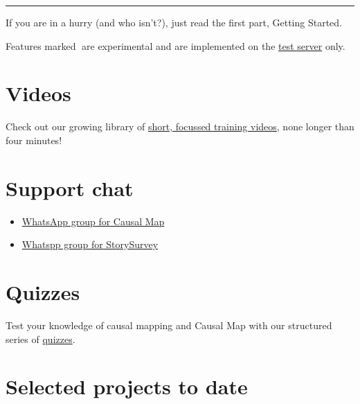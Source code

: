 \documentclass[
]{book}
\begin{document}
\begin{center}\rule{0.5\linewidth}{0.5pt}\end{center}

If you are in a hurry (and who isn't?), just read the first part, Getting Started.

Features marked 🧪are experimental and are implemented on the \href{https://causalmap.shinyapps.io/CM2test}{test server} only.

\hypertarget{videos}{%
\section{Videos}\label{videos}}

Check out our growing library of \href{https://guide.causalmap.app/xvideo-list.html}{short, focussed training videos}, none longer than four minutes!

\hypertarget{support-chat}{%
\section{Support chat}\label{support-chat}}

\begin{itemize}
\item
  \href{https://chat.whatsapp.com/KwWn0lfpHuR0qJKtkuGZUA}{WhatsApp group for Causal Map}
\item
  \href{https://chat.whatsapp.com/CdlkCKV8bP7ATYc4nioL0T}{Whatspp group for StorySurvey}

  \hypertarget{section}{%
  \section{}\label{section}}
\end{itemize}

\hypertarget{quizzes}{%
\section{Quizzes}\label{quizzes}}

Test your knowledge of causal mapping and Causal Map with our structured series of \href{https://causalmap.shinyapps.io/quizzes/}{quizzes}.

\hypertarget{selected-projects-to-date}{%
\section{Selected projects to date}\label{selected-projects-to-date}}
\end{document}
